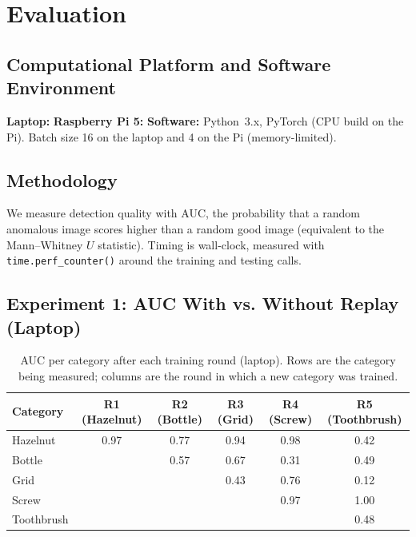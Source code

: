 \documentclass[11pt]{article}
\begin{document}
\section{Evaluation}

\subsection{Computational Platform and Software Environment}
\textbf{Laptop:} %
\textbf{Raspberry Pi 5:} %
\textbf{Software:} Python~3.x, PyTorch (CPU build on the Pi). Batch size 16 on the
laptop and 4 on the Pi (memory-limited).

\subsection{Methodology}
We measure detection quality with AUC, the probability that a random anomalous
image scores higher than a random good image (equivalent to the Mann--Whitney $U$
statistic). %
Timing is wall-clock, measured with \texttt{time.perf\_counter()} around the
training and testing calls.

\subsection{Experiment 1: AUC With vs. Without Replay (Laptop)}

\begin{table}[H]
\centering
\caption{AUC per category after each training round (laptop). Rows are the
category being measured; columns are the round in which a new category was trained.}
\label{tab:auc}
\begin{tabular}{lccccc}
\toprule
Category   & R1 (Hazelnut) & R2 (Bottle) & R3 (Grid) & R4 (Screw) & R5 (Toothbrush) \\
\midrule
Hazelnut   & 0.97 & 0.77 & 0.94 & 0.98 & 0.42 \\
Bottle     &      & 0.57 & 0.67 & 0.31 & 0.49 \\
Grid       &      &      & 0.43 & 0.76 & 0.12 \\
Screw      &      &      &      & 0.97 & 1.00 \\
Toothbrush &      &      &      &      & 0.48 \\
\bottomrule
\end{tabular}
\end{table}
\end{document}
